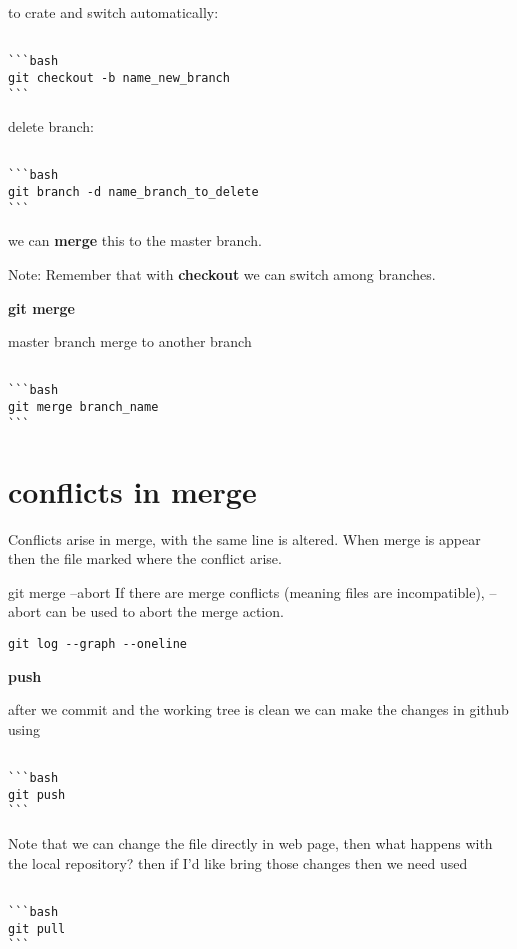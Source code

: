 \documentclass[10pt,a4paper]{article}
\begin{document}
to crate and switch automatically:
\begin{verbatim}

```bash
git checkout -b name_new_branch
```

\end{verbatim}


delete branch:
\begin{verbatim}

```bash
git branch -d name_branch_to_delete
```
\end{verbatim}

we can \textbf{merge} this to the master branch.


Note: Remember that with \textbf{checkout} we can switch among branches. 

\textbf{git merge}

master branch merge to another branch

\begin{verbatim}

```bash
git merge branch_name
```
\end{verbatim}

\section{conflicts in merge}

Conflicts arise in merge, with the same line is altered. When merge is appear then the file marked where the conflict arise.


git merge --abort	If there are merge conflicts (meaning files are incompatible), --abort can be used to abort the merge action.




\begin{verbatim}
git log --graph --oneline
\end{verbatim}




\textbf{push}

after we commit and the working tree is clean we 
can make the changes in github using 

\begin{verbatim}

```bash 
git push 
```
\end{verbatim} 
Note that we can change the file directly in web page, then what happens  with the local repository?
then if I'd like bring those changes then we need used 

\begin{verbatim}

```bash
git pull
```
\end{verbatim}
\end{document}
